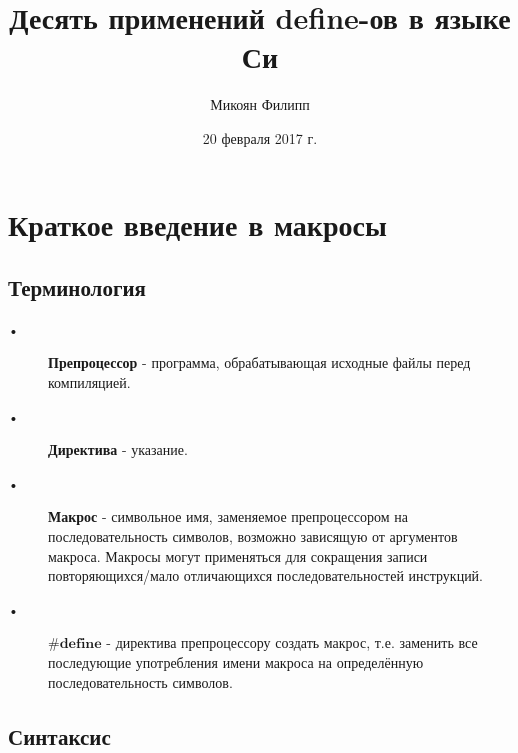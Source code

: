 \documentclass[a4paper]{article}
\title{Десять применений define-ов в языке Си}
\date{20 февраля 2017 г.}
\author{Микоян Филипп}
\begin{document}
	\maketitle

	\section{Краткое введение в макросы}
	
	\subsection{Терминология}
	
	\begin{description}
	\item[•] \textbf{Препроцессор} - программа, обрабатывающая исходные файлы перед компиляцией. 
	\item[•] \textbf{Директива} - указание. 
	\item[•] \textbf{Макрос} - символьное имя, заменяемое препроцессором на последовательность символов, возможно зависящую от аргументов макроса. Макросы могут применяться для сокращения записи повторяющихся/мало отличающихся последовательностей инструкций.
	\item[•] $\textbf{\#define}$ - директива препроцессору создать макрос, т.е. заменить все последующие употребления имени макроса на определённую последовательность символов.
	\end{description}
	
	\subsection{Синтаксис}
	
\end{document}
